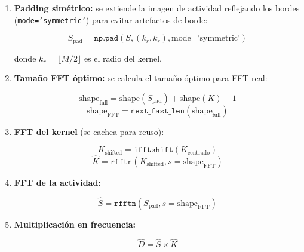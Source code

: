\documentclass[12pt,a4paper]{article}
\begin{document}
\begin{enumerate}
    \item \textbf{Padding simétrico:} se extiende la imagen de actividad
        reflejando los bordes (\texttt{mode='symmetric'}) para evitar
        artefactos de borde:

        \begin{equation}
            S_{\text{pad}} = \texttt{np.pad}(S, (k_r, k_r), \text{mode='symmetric'})
        \end{equation}

        donde $k_r = \lfloor M/2 \rfloor$ es el radio del kernel.

    \item \textbf{Tamaño FFT óptimo:} se calcula el tamaño óptimo para
        FFT real:

        \begin{equation}
            \text{shape}_{\text{full}} = \text{shape}(S_{\text{pad}}) + \text{shape}(K) - 1
        \end{equation}
        \begin{equation}
            \text{shape}_{\text{FFT}} = \texttt{next\_fast\_len}(\text{shape}_{\text{full}})
        \end{equation}

    \item \textbf{FFT del kernel} (se cachea para reuso):

        \begin{equation}
            K_{\text{shifted}} = \texttt{ifftshift}(K_{\text{centrado}})
        \end{equation}
        \begin{equation}
            \hat{K} = \texttt{rfftn}(K_{\text{shifted}}, s=\text{shape}_{\text{FFT}})
        \end{equation}

    \item \textbf{FFT de la actividad:}

        \begin{equation}
            \hat{S} = \texttt{rfftn}(S_{\text{pad}}, s=\text{shape}_{\text{FFT}})
        \end{equation}

    \item \textbf{Multiplicación en frecuencia:}

        \begin{equation}
            \hat{D} = \hat{S} \times \hat{K}
        \end{equation}


\end{enumerate}
\end{document}
